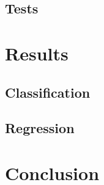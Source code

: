 \documentclass[twocolumn]{article}
\begin{document}
\subsection{Tests}

\section{Results}
\lipsum[2]

\subsection{Classification}

\subsection{Regression}

\section{Conclusion}
\lipsum[3]

\printbibliography
\end{document}

